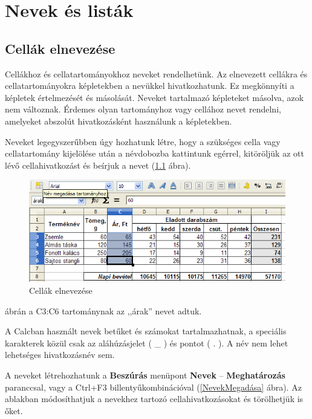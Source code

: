 \chapter{Nevek és listák}
\thispagestyle{empty}

\section{Cellák elnevezése }

Cellákhoz és cellatartományokhoz neveket rendelhetünk. Az
elnevezett cellákra és cellatartományokra képletekben a
nevükkel hivatkozhatunk. Ez megkönnyíti a képletek
értelmezését és másolását. Neveket tartalmazó
képleteket másolva, azok nem változnak. Érdemes olyan
tartományhoz vagy cellához nevet rendelni, amelyeket abszolút
hivatkozásként használunk a képletekben.

Neveket legegyszerűbben úgy hozhatunk létre, hogy a
szükséges cella vagy cellatartomány kijelölése után a
névdobozba kattintunk egérrel, kitöröljük az ott lévő
cellahivatkozást és beírjuk a nevet (\ref{CellákElnevezése} ábra).

\begin{figure}[!h]
\begin{center}
\includegraphics[width=14.395cm]{oocalcv1-img104.png}
\caption{Cellák elnevezése}\label{CellákElnevezése}
\end{center}
\end{figure}

 ábrán a C3:C6 tartománynak az
,,árak'' nevet adtuk.

A Calcban használt nevek betűket és számokat tartalmazhatnak,
a speciális karakterek közül csak az aláhúzásjelet ( \_ )
és pontot ( . ). A név nem lehet lehetséges hivatkozásnév
sem.

A neveket létrehozhatunk a \textbf{Beszúrás} menüpont
\textbf{Nevek} --  \textbf{Meghatározás} paranccsal, vagy a Ctrl+F3
billentyűkombinációval (\ref{NevekMegadása} ábra). Az ablakban
módosíthatjuk a nevekhez tartozó cellahivatkozásokat és
törölhetjük is őket.

